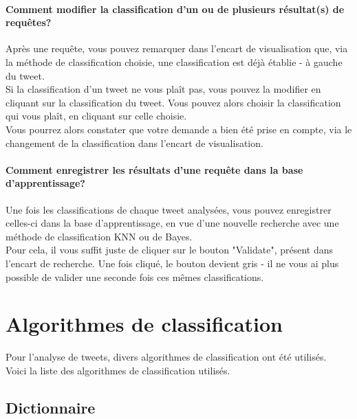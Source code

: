 \documentclass[pdftex,12pt,a4paper]{report}
\begin{document}
\begin{spacing}{1.2}
\subsubsection{Comment modifier la classification d'un ou de plusieurs résultat(s) de requêtes?}

Après une requête, vous pouvez remarquer dans l'encart de visualisation que, via la méthode de classification choisie, une classification est déjà établie - à gauche du tweet.
\\
Si la classification d'un tweet ne vous plaît pas, vous pouvez la modifier en cliquant sur la classification du tweet. Vous pouvez alors choisir la classification qui vous plaît, en cliquant sur celle choisie.
\\
Vous pourrez alors constater que votre demande a bien été prise en compte, via le changement de la classification dans l'encart de visualisation.

\subsubsection{Comment enregistrer les résultats d'une requête dans la base d'apprentissage?}

Une fois les classifications de chaque tweet analysées, vous pouvez enregistrer celles-ci dans la base d'apprentissage, en vue d'une nouvelle recherche avec une méthode de classification KNN ou de Bayes.
\\
Pour cela, il vous suffit juste de cliquer sur le bouton "Validate", présent dans l'encart de recherche. Une fois cliqué, le bouton devient gris - il ne vous ai plus possible de valider une seconde fois ces mêmes classifications.

\chapter{Algorithmes de classification}

Pour l'analyse de tweets, divers algorithmes de classification ont été utilisés.\\
Voici la liste des algorithmes de classification utilisés.

\section{Dictionnaire}


\end{spacing}
\end{document}
